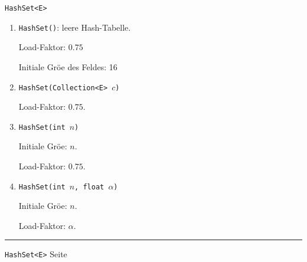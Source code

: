 \documentclass{slides}
\newcounter{mypage}
\begin{document}
\begin{slide}{}
\normalsize

\begin{center}
\texttt{HashSet<E>}
\end{center}
\vspace*{0.5cm}

\footnotesize
\begin{enumerate}
\item \texttt{HashSet()}: \quad leere Hash-Tabelle.  

      Load-Faktor: $0.75$ 

      Initiale Gr\"o\3e des Feldes: 16
\item \texttt{HashSet(Collection<E> $c$)}

      Load-Faktor: $0.75$.
\item \texttt{HashSet(int $n$)}
  
      Initiale Gr\"o\3e: $n$.  

      Load-Faktor: $0.75$.
\item \texttt{HashSet(int $n$, float $\alpha$)}

      Initiale Gr\"o\3e: $n$.  

      Load-Faktor: $\alpha$.
\end{enumerate}



\vspace*{\fill}
\tiny \addtocounter{mypage}{1}
\rule{17cm}{1mm}
\texttt{HashSet<E>} \hspace*{\fill} Seite 
\end{slide}


\end{document}
